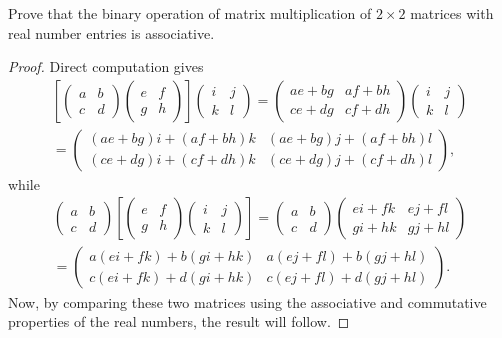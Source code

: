  Prove that the binary operation of matrix multiplication of
$2\times2$ matrices with real number entries is associative.
\begin{proof}
  Direct computation gives
  \begin{multline*}
    \left[
      \begin{pmatrix}
        a & b \\
        c & d
      \end{pmatrix}
      \begin{pmatrix}
        e & f \\
        g & h
      \end{pmatrix}
    \right]
    \begin{pmatrix}
      i & j \\
      k & l
    \end{pmatrix}
    =
    \begin{pmatrix}
      ae+bg & af+bh \\
      ce+dg & cf+dh
    \end{pmatrix}
    \begin{pmatrix}
      i & j \\
      k & l
    \end{pmatrix} \\
    =
    \begin{pmatrix}
      (ae+bg)i + (af+bh)k & (ae+bg)j + (af+bh)l \\
      (ce+dg)i + (cf+dh)k & (ce+dg)j + (cf+dh)l
    \end{pmatrix},
  \end{multline*}
  while
  \begin{multline*}
    \begin{pmatrix}
      a & b \\
      c & d
    \end{pmatrix}
    \left[
      \begin{pmatrix}
        e & f \\
        g & h
      \end{pmatrix}
      \begin{pmatrix}
        i & j \\
        k & l
      \end{pmatrix}
    \right]
    =
    \begin{pmatrix}
      a & b \\
      c & d
    \end{pmatrix}
    \begin{pmatrix}
      ei + fk & ej + fl \\
      gi + hk & gj + hl
    \end{pmatrix} \\
    =
    \begin{pmatrix}
      a(ei+fk) + b(gi+hk) & a(ej+fl) + b(gj+hl) \\
      c(ei+fk) + d(gi+hk) & c(ej+fl) + d(gj+hl)
    \end{pmatrix}.
  \end{multline*}
  Now, by comparing these two matrices using the associative and
  commutative properties of the real numbers, the result will follow.
\end{proof}

